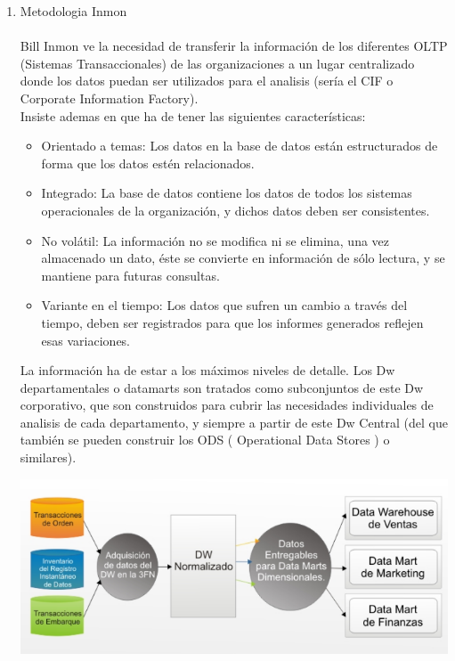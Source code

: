 \documentclass[preprint,12pt]{elsarticle}
\begin{document}
\begin{enumerate}[3.1]
    \item Metodologia Inmon \\
\\
Bill Inmon ve la necesidad de transferir la información de los diferentes OLTP (Sistemas Transaccionales) de las organizaciones a un lugar centralizado donde los datos puedan ser utilizados para el analisis (sería el CIF o Corporate Information Factory).\\
 Insiste ademas en que ha de tener las siguientes características:
\begin{itemize}
		\item Orientado a temas: Los datos en la base de datos están estructurados de forma que los datos estén relacionados.
		\item Integrado: La base de datos contiene los datos de todos los sistemas operacionales de la organización, y dichos datos deben ser consistentes.
		\item No volátil: La información no se modifica ni se elimina, una vez almacenado un dato, éste se convierte en información de sólo lectura, y se mantiene para futuras consultas.
		\item Variante en el tiempo: Los datos que sufren un cambio a través del tiempo, deben ser registrados para que los informes generados reflejen esas variaciones.
\end{itemize}

La información ha de estar a los máximos niveles de detalle. Los Dw departamentales o datamarts son tratados como subconjuntos de este Dw corporativo, que son construidos para cubrir las necesidades individuales de analisis de cada departamento, y siempre a partir de este Dw Central (del que también se pueden construir los ODS ( Operational Data Stores ) o similares).\\

\begin {center}
\includegraphics[scale= 0.80]{./Imagenes/inmon1.png}
\end {center}


\end{enumerate}
\end{document}
